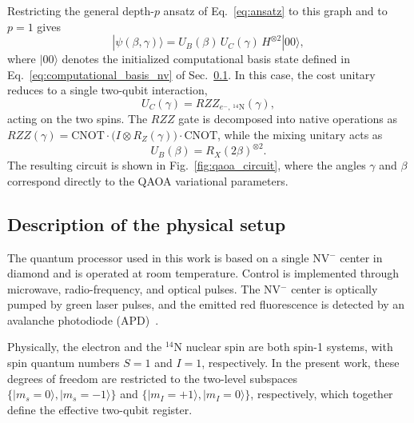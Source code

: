\documentclass[conference]{IEEEtran}
\begin{document}
Restricting the general depth-\(p\) ansatz of Eq.~\eqref{eq:ansatz} to this
graph and to \(p=1\) gives
\begin{equation}
    |\psi(\beta,\gamma)\rangle
    =
    U_B(\beta)\,U_C(\gamma)\,H^{\otimes 2}|00\rangle,
    \label{eq:two_qubit_ansatz}
\end{equation}
where \(|00\rangle\) denotes the initialized computational basis state defined
in Eq.~\eqref{eq:computational_basis_nv} of Sec.~\ref{sec:physical_setup}. In
this case, the cost unitary reduces to a single two-qubit interaction,
\begin{equation}
U_C(\gamma)=RZZ_{e^-,\,{}^{14}\mathrm N}(\gamma),    
\end{equation}
acting on the two spins. The \(RZZ\) gate is decomposed into native operations
as \( RZZ(\gamma) = \mathrm{CNOT}\cdot\bigl(I\otimes
R_Z(\gamma)\bigr)\cdot\mathrm{CNOT}\), while the mixing unitary acts as
\begin{equation}
    U_B(\beta)=R_X(2\beta)^{\otimes 2}.
\end{equation}
The resulting circuit is shown in Fig.~\ref{fig:qaoa_circuit}, where the angles
\(\gamma\) and \(\beta\) correspond directly to the QAOA variational parameters.






\subsection{Description of the physical setup}\label{sec:physical_setup}

The quantum processor used in this work is based on a single NV\(^-\) center in
diamond and is operated at room temperature. Control is implemented through
microwave, radio-frequency, and optical pulses. The NV\(^-\) center is optically
pumped by green laser pulses, and the emitted red fluorescence is detected by an
avalanche photodiode (APD)~\cite{balasubramanian_nanoscale_2008}.

Physically, the electron and the \({}^{14}\mathrm N\) nuclear spin are both
spin-1 systems, with spin quantum numbers \(S=1\) and \(I=1\), respectively. In
the present work, these degrees of freedom are restricted to the two-level
subspaces \(\{|m_s=0\rangle, |m_s=-1\rangle\}\) and \(\{|m_I=+1\rangle,
|m_I=0\rangle\}\), respectively, which together define the effective two-qubit
register.
\end{document}

